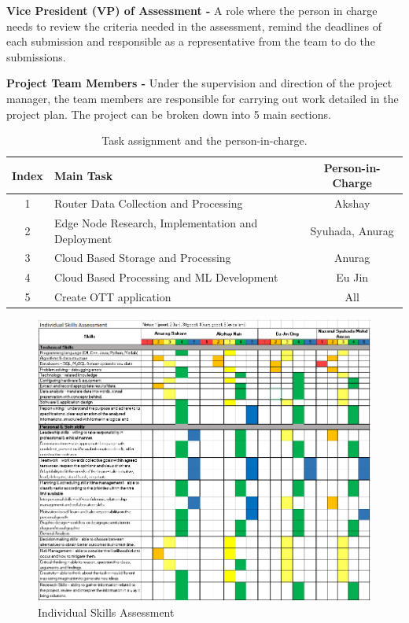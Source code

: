 \textbf{Vice President (VP) of Assessment - }
A role where the person in charge needs to review the criteria needed in the assessment, remind the deadlines of each submission and responsible as a representative from the team to do the submissions.

\textbf{Project Team Members - }
Under the supervision and direction of the project manager, the team members are responsible for carrying out work detailed in the project plan. The project can be broken down into 5 main sections.

\begin{table}[ht]
\centering
\begin{tabular}{ |c|p{9cm}|c| } 
 \hline
 \textbf{Index} & \textbf{Main Task} & \textbf{Person-in-Charge}\\ 
  \hline
1 & Router Data Collection and Processing & Akshay \\ 
  \hline
2 & Edge Node Research, Implementation and Deployment & Syuhada, Anurag \\ 
  \hline
3 & Cloud Based Storage and Processing & Anurag \\ 
  \hline
4 & Cloud Based Processing and ML Development & Eu Jin \\ 
  \hline
5 & Create OTT application & All \\ 

 \hline
\end{tabular}
\caption{Task assignment and the person-in-charge. }
\label{table:task_management}
\end{table}

\begin{figure}[ht]
    \centering
    \includegraphics[width=1\linewidth]{images/iusa.png}
    \caption{Individual Skills Assessment}
    \label{fig:team_isa}
\end{figure}

